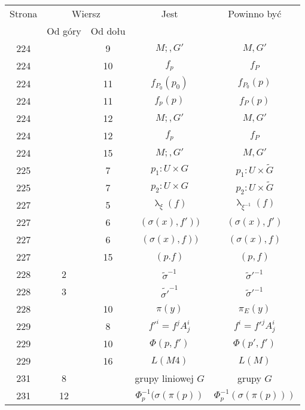 \documentclass[a4paper,11pt]{article}
\numberwithin{equation}{section}
\renewcommand{\lambda}{\uplambda}
\begin{document}
\begin{center}
  \begin{tabular}{|c|c|c|c|c|}
    \hline
    Strona & \multicolumn{2}{c|}{Wiersz} & Jest
                              & Powinno być \\ \cline{2-3}
    & Od góry & Od dołu & & \\
    \hline
    224 & & \hphantom{0}9 & $M;, G'$ & $M, G'$ \\
    224 & & 10 & $f_{ p }$ & $f_{ P }$ \\
    224 & & 11 & $f_{ P_{ 0 } }( p_{ 0 } )$ & $f_{ P_{ 0 } }( p )$ \\
    224 & & 11 & $f_{ p }( p )$ & $f_{ P }( p )$ \\
    224 & & 12 & $M;, G'$ & $M, G'$ \\
    224 & & 12 & $f_{ p }$ & $f_{ P }$ \\
    224 & & 15 & $M;, G'$ & $M, G'$ \\
    225 & & \hphantom{0}7 & $p_{ 1 } : U \times G$
           & $p_{ 1 } : U \times \widetilde{ G }$ \\
    225 & & \hphantom{0}7 & $p_{ 2 } : U \times G$
    & $p_{ 2 } : U \times \widetilde{ G }$ \\
    227 & & \hphantom{0}5 & $\lambda_{ \xi }( f )$ & $\lambda_{ \xi^{ -1 } }( f )$ \\
    227 & & \hphantom{0}6 & $( \sigma( x ), f' ) )$ & $( \sigma( x ), f' )$ \\
    227 & & \hphantom{0}6 & $( \sigma( x ), f ) )$ & $( \sigma( x ), f )$ \\
    227 & & 15 & $( p. f )$ & $( p, f )$ \\
    228 & \hphantom{0}2 & & $\widetilde{ \sigma }^{ -1 }$
    & $\widetilde{ \sigma }'^{ -1 }$ \\
    228 & \hphantom{0}3 & & $\widetilde{ \sigma' }^{ -1 }$
    & $\widetilde{ \sigma }'^{ -1 }$ \\
    228 & & 10 & $\pi( y )$ & $\pi_{ E }( y )$ \\
    229 & & \hphantom{0}8 & $f'^{ i } = f^{ j } A^{ i }_{ j }$
           & $f^{ i } = f'^{ j } A^{ i }_{ j }$ \\
    229 & & 10 & $\Phi( p, f' )$ & $\Phi( p', f' )$ \\
    229 & & 16 & $L( M 4 )$ & $L( M )$ \\
    231 & \hphantom{0}8 & & grupy liniowej $G$ & grupy $G$ \\
    231 & 12 & & $\Phi^{ -1 }_{ p }( \sigma( \pi( p ) )$
           & $\Phi^{ -1 }_{ p }( \sigma( \pi( p ) ) )$ \\

\end{tabular}
\end{center}
\end{document}

